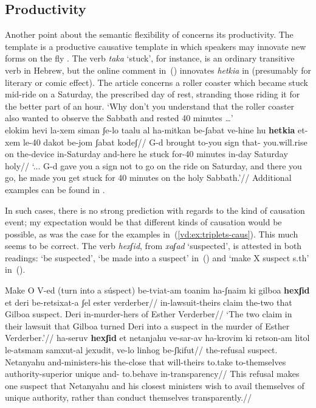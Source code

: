 	\subsection{Productivity} \label{vd:caus:product}
Another point about the semantic flexibility of {\vd} concerns its productivity. The template {\thif} is a productive causative template in which speakers may innovate new forms on the fly \citep{lev16,kastner19tlr}. The verb \emph{taka} `stuck', for instance, is an ordinary transitive verb in Hebrew, but the online comment in~(\nextx) innovates \emph{hetkia} in {\thif} (presumably for literary or comic effect). The article concerns a roller coaster which became stuck mid-ride on a Saturday, the prescribed day of rest, stranding those riding it for the better part of an hour.
\ex `Why don't you understand that the roller coaster also wanted to observe the Sabbath and rested 40 minutes {\dots}' \\
	\begingl
	 elokim hevi la-xem siman ʃe-lo taalu al ha-mitkan be-ʃabat ve-hine hu \textbf{hetkia} et-xem le-40 dakot be-jom ʃabat kodeʃ//
	\glb {} G-d brought to-you sign that- you.will.rise on the-device in-Saturday and-here he stuck  for-40 minutes in-day Saturday holy//
	\glft `{...} G-d gave you a sign not to go on the ride on Saturday, and there you go, he made you get stuck for 40 minutes on the holy Sabbath.'//
	\endgl	
\xe
Additional examples can be found in \cite{lev16}.

In such cases, there is no strong prediction with regards to the kind of causation event; my expectation would be that different kinds of causation would be possible, as was the case for the examples in~(\ref{vd:ex:triplets-caus}). This much seems to be correct. The verb \emph{hexʃid}, from \emph{xaʃad} `suspected', is attested in both readings: `be suspected', `be made into a suspect' in~(\nextx) and `make X suspect s.th' in~(\anextx).

\pex Make O V-ed (turn into a súspect)
	\a \begingl
		\gla be-tviat-am toanim ha-ʃnaim ki gilboa \textbf{hexʃid} et deri be-re{ts}ixat-a ʃel ester verderber//
		\glb in-lawsuit-theirs claim the-two that Gilboa suspect.  Deri in-murder-hers of Esther Verderber//
		\glft `The two claim in their lawsuit that Gilboa turned Deri into a suspect in the murder of Esther Verderber.'//
	\endgl
	\a \begingl
		\gla ha-seruv \textbf{hexʃid} et netanjahu ve-sar-av ha-krovim ki re{ts}on-am litol le-a{ts}mam samxut-al jexudit, ve-lo linhog be-ʃkifut//
		\glb the-refusal suspect.  Netanyahu and-ministers-his the-close that will-theirs to.take to-themselves authority-superior unique and- to.behave in-transparency//
		\glft This refusal makes one suspect that Netanyahu and his closest ministers wish to avail themselves of unique authority, rather than conduct themselves transparently.//
	\endgl
\xe
	
